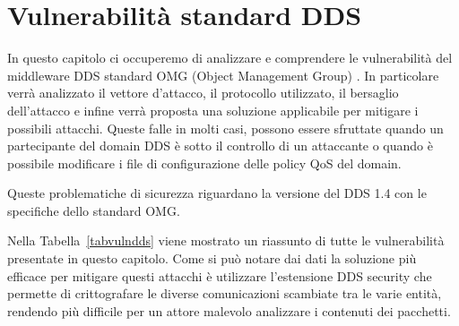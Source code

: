 \chapter{Vulnerabilità standard DDS}
\label{chvulstdndds}

In questo capitolo ci occuperemo di analizzare e comprendere 
le vulnerabilità
del middleware DDS standard OMG (Object Management Group) \cite{8469351}. 
In particolare
verrà analizzato il vettore d'attacco, il protocollo utilizzato, il bersaglio
dell'attacco e infine verrà proposta una soluzione applicabile per
mitigare i possibili attacchi. %
Queste falle in molti casi, possono essere sfruttate 
quando un partecipante del domain DDS è sotto il controllo di un attaccante
o quando è possibile modificare i file di configurazione delle policy QoS 
del domain.

Queste problematiche di sicurezza
riguardano la versione del DDS 1.4 con le specifiche 
dello standard OMG.

Nella Tabella~\ref{tabvulndds} viene mostrato un riassunto di tutte
le vulnerabilità presentate in questo capitolo. Come si può notare dai dati 
la soluzione più efficace per mitigare questi attacchi è utilizzare 
l'estensione DDS security che permette di crittografare le diverse
comunicazioni
scambiate tra le varie entità, rendendo più difficile per un attore 
malevolo
analizzare i contenuti dei pacchetti.







\setlength{\arrayrulewidth}{1.0pt} %


